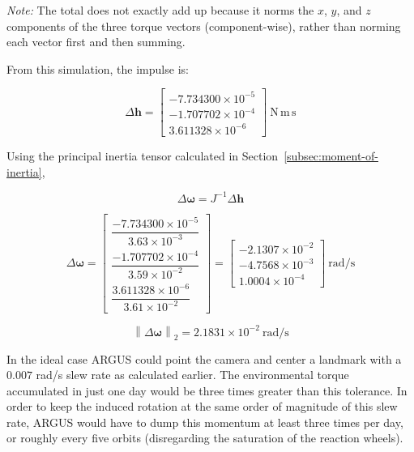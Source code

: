\documentclass[conference,onecolumn,draftclsnofoot]{IEEEtran}
\begin{document}
\noindent\textit{Note:} The total does not exactly add up because it norms the $x$, $y$, and $z$ components of the three torque vectors (component-wise), rather than norming each vector first and then summing.

From this simulation, the impulse is:

\begin{equation}
\Delta \mathbf{h}
=
\begin{bmatrix}
-7.734300\times 10^{-5}\\
-1.707702\times 10^{-4}\\
3.611328\times 10^{-6}
\end{bmatrix}
\ \mathrm{N\,m\,s}
\end{equation}

Using the principal inertia tensor calculated in Section~\ref{subsec:moment-of-inertia},

\begin{equation}
\Delta \boldsymbol{\omega}
=
J^{-1}\Delta \mathbf{h}
\end{equation}

\begin{equation}
\Delta \boldsymbol{\omega}
=
\begin{bmatrix}
\dfrac{-7.734300\times10^{-5}}{3.63\times10^{-3}}\\[6pt]
\dfrac{-1.707702\times10^{-4}}{3.59\times10^{-2}}\\[6pt]
\dfrac{3.611328\times10^{-6}}{3.61\times10^{-2}}
\end{bmatrix}
=
\begin{bmatrix}
-2.1307\times10^{-2}\\
-4.7568\times10^{-3}\\
1.0004\times10^{-4}
\end{bmatrix}
\ \mathrm{rad/s}
\end{equation}

\begin{equation}
\left\|\Delta \boldsymbol{\omega}\right\|_2
=
2.1831\times10^{-2}\ \mathrm{rad/s}
\end{equation}

In the ideal case ARGUS could point the camera and center a landmark with a $0.007$ rad/s slew rate as calculated earlier. The environmental torque accumulated in just one day would be three times greater than this tolerance. In order to keep the induced rotation at the same order of magnitude of this slew rate, ARGUS would have to dump this momentum at least three times per day, or roughly every five orbits (disregarding the saturation of the reaction wheels).
\end{document}
